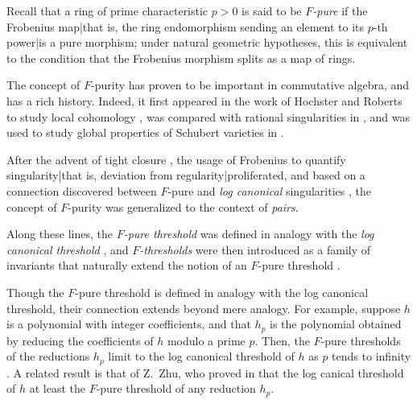 \documentclass{amsart}
\begin{document}
Recall that a ring of prime characteristic $p>0$ is said to be \emph{$F$-pure} if the Frobenius map|that is, the ring endomorphism sending an element to its $p$-th power|is a pure morphism;  under natural geometric hypotheses, this is equivalent to the condition that the Frobenius morphism splits as a map of rings.

The concept of $F$-purity has proven to be important in commutative algebra, and has a rich history.  Indeed, it first appeared in the work \cite{HochsterRobertsFrobeniusLocalCohomology}  of Hochster and Roberts to study local cohomology \cite{HochsterRobertsFrobeniusLocalCohomology}, was compared with rational singularities in  \cite{FedderFPureRat}, and was used to study global properties of Schubert varieties in \cite{MehtaRamanathanFrobeniusSplittingAndCohomologyVanishing}.

After the advent of tight closure \cite{HochsterHunekeTC1}, the usage of Frobenius to quantify singularity|that is, deviation from regularity|proliferated, and based on a connection discovered between $F$-pure and \emph{log canonical} singularities \cite{HaraWatanabeFRegFPure}, the concept of $F$-purity was generalized to the context of \emph{pairs}.

Along these lines, the \emph{$F$-pure threshold} %
was defined in analogy with the \emph{log canonical threshold} \cite{TakagiWatanabeFPureThresh}, and
\emph{$F$-thresholds} were then introduced as a family of invariants that naturally extend the notion of an $F$-pure threshold \cite{MustataTakagiWatanabeFThresholdsAndBernsteinSato}.

Though the $F$-pure threshold is defined in analogy with the log canonical threshold, their connection extends beyond mere analogy. For example, suppose $h$ is a polynomial with integer coefficients, and that $h_p$ is the polynomial obtained by reducing the coefficients of $h$ modulo a prime $p$.  Then, the $F$-pure thresholds of the reductions $h_p$ limit to the log canonical threshold of $h$ as $p$ tends to infinity \cite{HaraYoshidaGeneralizationOfTightClosure}.    A related result is that of Z.~Zhu, who proved in  \cite[Corollary 4.2]{ZhuLogCanoincalThresholdsInPositiveChar} that the log canical threshold of $h$ at least the $F$-pure threshold of any reduction $h_p$.
\end{document}

